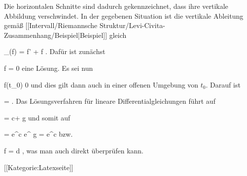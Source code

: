 Die horizontalen Schnitte sind dadurch gekennzeichnet, dass ihre vertikale Abbildung verschwindet. In der gegebenen Situation ist die vertikale Ableitung  gemäß
[[Intervall/Riemannsche Struktur/Levi-Civita-Zusammenhang/Beispiel|Beispiel]]
gleich

\mavergleichskettedisp
{\vergleichskette
{ \nabla_\partial (f)
}
{ =} { f' + f {  }
}
{ } {
}
{ } {
}
{ } {}
}
{}{}{.}
Dafür ist zunächst

\mavergleichskette
{\vergleichskette
{ f
}
{ = }{ 0
}
{  }{
}
{    }{
}
{   }{
}
}
{}{}{}
eine Lösung. Es sei nun

\mavergleichskette
{\vergleichskette
{ f(t_0)
}
{ \neq }{ 0
}
{  }{
}
{    }{
}
{   }{
}
}
{}{}{}
und dies gilt dann auch in einer offenen Umgebung von $t_0$. Darauf ist

\mavergleichskettedisp
{\vergleichskette
{  {  }
}
{ =} { {  }
}
{ } {
}
{ } {
}
{ } {
}
}
{}{}{.}
Das Lösungsverfahren für lineare Differentialgleichungen führt auf

\mavergleichskettedisp
{\vergleichskette
{   \ln  {}
}
{ =} { c+ {  }  \ln   g
}
{ } {
}
{ } {
}
{ } {
}
}
{}{}{}
und somit auf

\mavergleichskettedisp
{\vergleichskette
{ 
}
{ =} { e^c e^{ {  }  \ln  g }
}
{ =} { e^c  
}
{ } {
}
{ } {
}
}
{}{}{}
bzw.

\mavergleichskettedisp
{\vergleichskette
{ f
}
{ =} { d 
}
{ } {
}
{ } {
}
{ } {
}
}
{}{}{}
 {} {,}
was man auch direkt überprüfen kann.

 [[Kategorie:Latexseite]]
